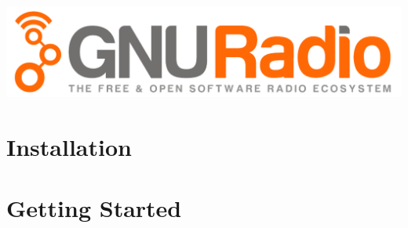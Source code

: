\documentclass[10pt]{article}
\begin{document}
\includegraphics[width=0.95\linewidth]{gnuradio_logo_web}


\begin{multicols*}{3}
\section{Installation}




\section{Getting Started}



\end{multicols*}
\end{document}
